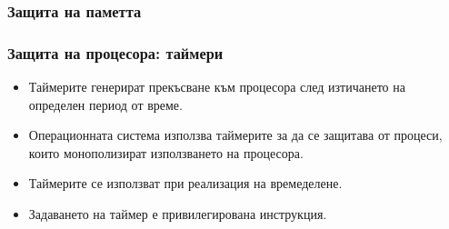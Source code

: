 \documentclass[ignorenonframetext, hyperref=unicode]{beamer}
\begin{document}
\begin{frame}
\frametitle{Защита на паметта}
\begin{figure}[h]
\center
{}
\end{figure}
\end{frame}

\begin{frame}
\frametitle{Защита на процесора: таймери}
\begin{itemize}
\item Таймерите генерират прекъсване към процесора след изтичането на определен
период от време.
\item Операционната система използва таймерите за да се защитава от процеси,
които монополизират използването на процесора.
\item Таймерите се използват при реализация на времеделене.
\item Задаването на таймер е привилегирована инструкция.
\end{itemize}
\end{frame}
\end{document}
